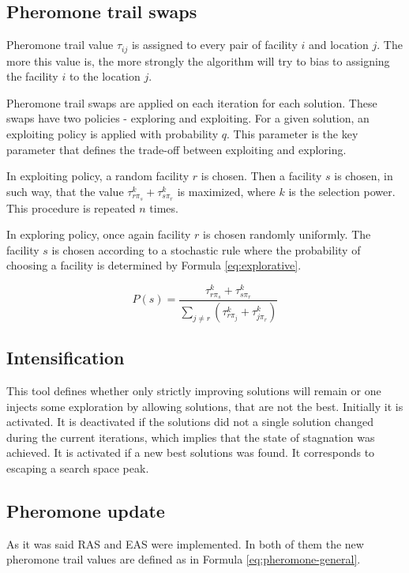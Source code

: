 \documentclass[12pt]{article}
\begin{document}
\subsection{Pheromone trail swaps}

Pheromone trail value $\tau_{ij}$ is assigned to every pair of facility $i$ and location $j$. The more this value is, the more strongly the algorithm will try to bias to assigning the facility $i$ to the location $j$.

Pheromone trail swaps are applied on each iteration for each solution. These swaps have two policies - exploring and exploiting. For a given solution, an exploiting policy is applied with probability $q$. This parameter is the key parameter that defines the trade-off between exploiting and exploring.

In exploiting policy, a random facility $r$ is chosen. Then a facility $s$ is chosen, in such way, that the value $\tau_{r\pi_s}^k + \tau_{s\pi_r}^k$ is maximized, where $k$ is the selection power. This procedure is repeated $n$ times. 

In exploring policy, once again facility $r$ is chosen randomly uniformly. The facility $s$ is chosen according to a stochastic rule where the probability of choosing a facility is determined by Formula \ref{eq:explorative}.

\begin{equation}
P(s) = \frac{\tau_{r\pi_s}^k + \tau_{s\pi_r}^k}{\sum_{j \ne r} (\tau_{r\pi_j}^k + \tau_{j\pi_r}^k)}
\label{eq:explorative}
\end{equation}

\subsection{Intensification}

This tool defines whether only strictly improving solutions will remain or one injects some exploration by allowing solutions, that are not the best. Initially it is activated. It is deactivated if the solutions did not a single solution changed during the current iterations, which implies that the state of stagnation was achieved. It is activated if a new best solutions was found. It corresponds to escaping a search space peak.

\subsection{Pheromone update}

As it was said RAS and EAS were implemented. In both of them the new pheromone trail values are defined as in Formula \ref{eq:pheromone-general}.
\end{document}
